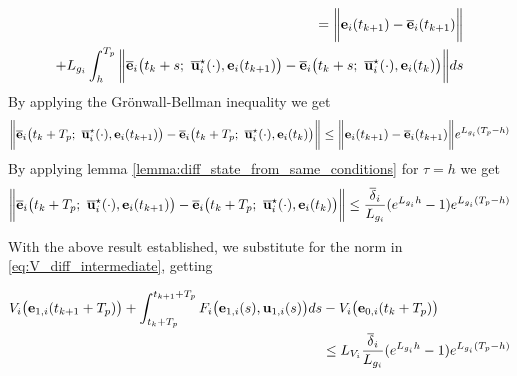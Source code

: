 \begin{gg_box}
\begin{alignat}{2}
    = \bigg \| \vect{e}_i(t_{k+1}) - \overline{\vect{e}}_i(t_{k+1}) \bigg\| \\
    +  L_{g_i} \int_{h}^{T_p} \bigg\| \overline{\vect{e}}_i\big(t_k + s;\ \overline{\vect{u}}_i^{\star}(\cdot), \vect{e}_i(t_{k+1})\big)
    - \overline{\vect{e}}_i\big(t_k + s;\ \overline{\vect{u}}_i^{\star}(\cdot), \vect{e}_i(t_k)\big) \bigg\| ds
  \end{alignat}
  By applying the  Gr\"{o}nwall-Bellman inequality we get
  \begin{alignat}{2}
    \bigg \|\overline{\vect{e}}_i\big(t_k + T_p;\ \overline{\vect{u}}_i^{\star}(\cdot), \vect{e}_i(t_{k+1})\big)
      - \overline{\vect{e}}_i\big(t_k + T_p;\ \overline{\vect{u}}_i^{\star}(\cdot), \vect{e}_i(t_k)\big) \bigg\|
      \leq \bigg \| \vect{e}_i(t_{k+1}) - \overline{\vect{e}}_i(t_{k+1}) \bigg\| e^{L_{g_i} (T_p - h)}
  \end{alignat}
  By applying lemma \eqref{lemma:diff_state_from_same_conditions} for $\tau = h$
  we get
  \begin{alignat}{2}
    \bigg \|\overline{\vect{e}}_i\big(t_k + T_p;\ \overline{\vect{u}}_i^{\star}(\cdot), \vect{e}_i(t_{k+1})\big)
      - \overline{\vect{e}}_i\big(t_k + T_p;\ \overline{\vect{u}}_i^{\star}(\cdot), \vect{e}_i(t_k)\big) \bigg\|
      \leq \dfrac{\overline{\delta}_i}{L_{g_i}} (e^{L_{g_i}h} - 1) e^{L_{g_i} (T_p - h)}
  \end{alignat}
\end{gg_box}
With the above result established, we substitute for the norm in
\eqref{eq:V_diff_intermediate}, getting
\begin{bw_box}
\begin{align}
  V_i\big(\bm{\mathbf{e}}_{1,i}(t_{k+1} + T_p)\big)
  + \int_{t_k + T_p}^{t_{k+1} + T_p} F_i\big(\bm{\mathbf{e}}_{1,i}(s), \bm{\mathbf{u}}_{1,i}(s)\big) ds
  &- V_i\big(\bm{\mathbf{e}}_{0,i}(t_k + T_p)\big) \\
  &\leq L_{V_i}\dfrac{\overline{\delta}_i}{L_{g_i}} (e^{L_{g_i}h} - 1) e^{L_{g_i} (T_p - h)}
  \label{eq:end_result_diff_V_plus_int}
\end{align}
\end{bw_box}

